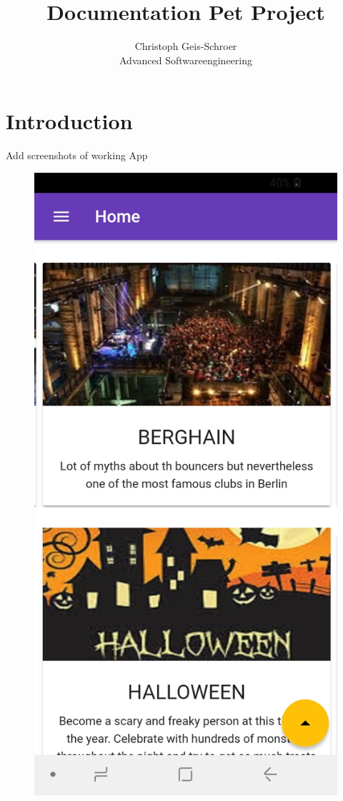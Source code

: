 \documentclass[12pt]{article}
\title{Documentation Pet Project}%
\author{Christoph Geis-Schroer\\ %
Advanced Softwareengineering} %
\begin{document}
\maketitle

\section{Introduction}

Add screenshots of working App

\begin{figure}[H]
  \includegraphics[width=\linewidth]{figures/Main.jpg}

\end{figure}
\end{document}
